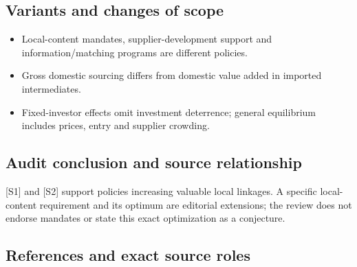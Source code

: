 \documentclass[11pt,a4paper]{article}
\begin{document}
\subsection*{Variants and changes of scope}

\begin{itemize}
\item Local-content mandates, supplier-development support and information/matching programs are different policies.
\item Gross domestic sourcing differs from domestic value added in imported intermediates.
\item Fixed-investor effects omit investment deterrence; general equilibrium includes prices, entry and supplier crowding.
\end{itemize}

\subsection*{Audit conclusion and source relationship}

[S1] and [S2] support policies increasing valuable local linkages. A specific local-content requirement and its optimum are editorial extensions; the review does not endorse mandates or state this exact optimization as a conjecture.

\subsection*{References and exact source roles}
\end{document}
